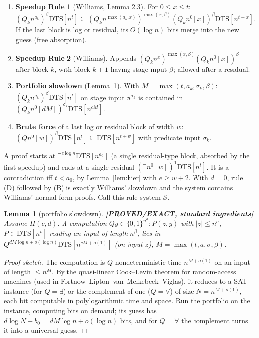 \documentclass[11pt]{article}
\newtheorem{lemma}[theorem]{Lemma}
\theoremstyle{definition}
\theoremstyle{remark}
\newcommand{\DTS}{\mathrm{DTS}}
\newcommand{\status}[1]{\textbf{[#1]}}
\begin{document}
\begin{enumerate}
\item[(S)] \textbf{Speedup Rule 1} (Williams, Lemma 2.3). For $0\le x\le t$:
\[
(Q_kn^{a_k})^{\beta}\DTS[n^t]\subseteq(Q_kn^{\max(a_k,x)})^{\max(x,\beta)}(\overline{Q_k}n^0[x])^{\beta}\DTS[n^{t-x}].
\]
If the last block is log or residual, its $O(\log n)$ bits merge into the new guess (free absorption).
\item[(T)] \textbf{Speedup Rule 2} (Williams). Appends
$(\overline{Q_k}n^x)^{\max(x,\beta)}(Q_kn^0[x])^{\beta}$ after block $k$, with block $k+1$ having stage
input $\beta$; allowed after a residual.
\item[(D)] \textbf{Portfolio slowdown} (Lemma~\ref{lem:slow}). With $M=\max(t,a_k,\sigma_k,\beta)$:
$(Q_kn^{a_k})^{\beta}\DTS[n^t]$ on stage input $n^{\sigma_k}$ is contained in
$(Q_k n^0[dM])^{\sigma_k}\DTS[n^{cM}]$.
\item[(B)] \textbf{Brute force} of a last log or residual block of width $w$:
$(Q n^0[w])^{\beta}\DTS[n^t]\subseteq\DTS[n^{t+w}]$ with predicate input $\sigma_k$.
\end{enumerate}

\noindent A proof starts at $\exists^{e\log n}\DTS[n^{a_0}]$ (a single residual-type block, absorbed by the
first speedup) and ends at a single residual $(\exists n^0[w])^1\DTS[n^{t}]$. It is a contradiction iff
$t<a_0$, by Lemma~\ref{lem:hier} with $e\ge w+2$. With $d=0$, rule (D) followed by (B) is exactly Williams'
slowdown and the system contains Williams' normal-form proofs. Call this rule system $\mathcal S$.

\begin{lemma}[portfolio slowdown]\label{lem:slow} \status{PROVED/EXACT, standard ingredients}
Assume $H(c,d)$. A computation $Q y\in\{0,1\}^{n^{a}}:P(z,y)$ with $|z|\le n^{\sigma}$, $P\in\DTS[n^{t}]$
reading an input of length $n^{\beta}$, lies in $Q^{dM\log n+o(\log n)}\DTS[n^{cM+o(1)}]$ (on input $z$),
$M=\max(t,a,\sigma,\beta)$.
\end{lemma}
\begin{proof}[Proof sketch]
The computation is $Q$-nondeterministic time $n^{M+o(1)}$ on an input of length $\le n^{M}$. By the
quasi-linear Cook--Levin theorem for random-access machines (used in Fortnow--Lipton--van~Melkebeek--Viglas),
it reduces to a SAT instance (for $Q=\exists$) or the complement of one ($Q=\forall$) of size
$N=n^{M+o(1)}$, each bit computable in polylogarithmic time and space. Run the portfolio on the instance,
computing bits on demand; its guess has $d\log N+b_0=dM\log n+o(\log n)$ bits, and for $Q=\forall$ the
complement turns it into a universal guess.
\end{proof}
\end{document}
